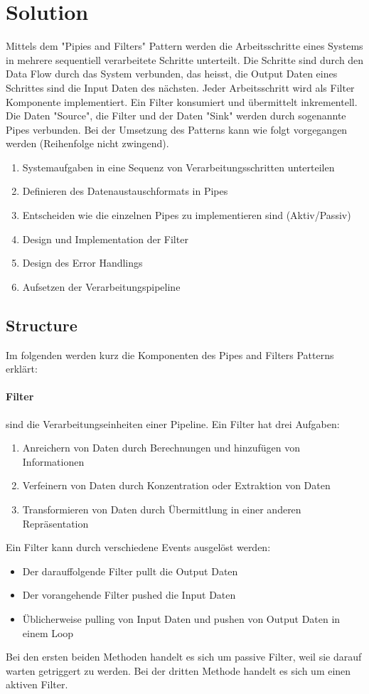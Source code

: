 \section{Solution}
Mittels dem "Pipies and Filters" Pattern werden die Arbeitsschritte eines Systems in mehrere sequentiell verarbeitete Schritte unterteilt. Die Schritte sind durch den Data Flow durch das System verbunden, das heisst, die Output Daten eines Schrittes sind die Input Daten des nächsten. Jeder Arbeitsschritt wird als Filter Komponente implementiert. Ein Filter konsumiert und übermittelt inkrementell. Die Daten "Source", die Filter und der Daten "Sink" werden durch sogenannte Pipes verbunden.
Bei der Umsetzung des Patterns kann wie folgt vorgegangen werden (Reihenfolge nicht zwingend).
\begin{enumerate}
	\item Systemaufgaben in eine Sequenz von Verarbeitungsschritten unterteilen
	\item Definieren des Datenaustauschformats in Pipes
	\item Entscheiden wie die einzelnen Pipes zu implementieren sind (Aktiv/Passiv)
	\item Design und Implementation der Filter
	\item Design des Error Handlings
	\item Aufsetzen der Verarbeitungspipeline
\end{enumerate}

\subsection{Structure}
Im folgenden werden kurz die Komponenten des Pipes and Filters Patterns erklärt:
\paragraph{Filter} sind die Verarbeitungseinheiten einer Pipeline. Ein Filter hat drei Aufgaben:
\begin{enumerate}
	\item Anreichern von Daten durch Berechnungen und hinzufügen von Informationen
	\item Verfeinern von Daten durch Konzentration oder Extraktion von Daten
	\item Transformieren von Daten durch Übermittlung in einer anderen Repräsentation
\end{enumerate}
Ein Filter kann durch verschiedene Events ausgelöst werden:
\begin{itemize}
	\item Der darauffolgende Filter pullt die Output Daten
	\item Der vorangehende Filter pushed die Input Daten
	\item Üblicherweise pulling von Input Daten und pushen von Output Daten in einem Loop
\end{itemize}
Bei den ersten beiden Methoden handelt es sich um passive Filter, weil sie darauf warten getriggert zu werden. Bei der dritten Methode handelt es sich um einen aktiven Filter. 
